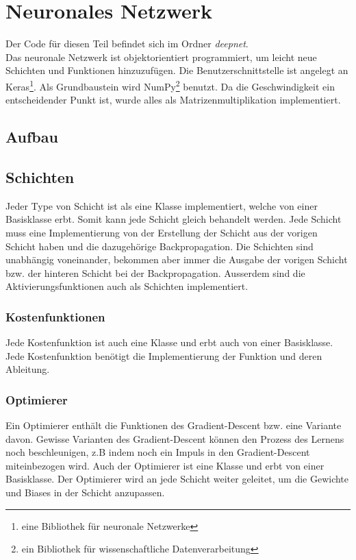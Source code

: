 \documentclass[12pt,a4paper]{report}
\begin{document}
\section{Neuronales Netzwerk}
Der Code für diesen Teil befindet sich im Ordner \textit{deepnet}.\bigskip\\
Das neuronale Netzwerk ist objektorientiert programmiert, um leicht neue Schichten und Funktionen hinzuzufügen.
Die Benutzerschnittstelle ist angelegt an Keras\cite{chollet2015keras}\footnote{eine Bibliothek für neuronale Netzwerke}.
Als Grundbaustein wird NumPy\cite{numpy}\footnote{ein Bibliothek für wissenschaftliche Datenverarbeitung} benutzt.
Da die Geschwindigkeit ein entscheidender Punkt ist, wurde alles als Matrizenmultiplikation implementiert.

\subsection{Aufbau}
\subsection{Schichten}
Jeder Type von Schicht ist als eine Klasse implementiert, welche von einer Basisklasse erbt.
Somit kann jede Schicht gleich behandelt werden.
Jede Schicht muss eine Implementierung von der Erstellung der Schicht aus der vorigen Schicht haben und die dazugehörige Backpropagation.
Die Schichten sind unabhängig voneinander, bekommen aber immer die Ausgabe der vorigen Schicht bzw. der hinteren Schicht bei der Backpropagation.
Ausserdem sind die Aktivierungsfunktionen auch als Schichten implementiert.
\subsubsection{Kostenfunktionen}
Jede Kostenfunktion ist auch eine Klasse und erbt auch von einer Basisklasse.
Jede Kostenfunktion benötigt die Implementierung der Funktion und deren Ableitung.
\subsubsection{Optimierer}
Ein Optimierer enthält die Funktionen des Gradient-Descent bzw. eine Variante davon.
Gewisse Varianten des Gradient-Descent können den Prozess des Lernens noch beschleunigen,
z.B indem noch ein Impuls in den Gradient-Descent miteinbezogen wird\cite{optimization}.
Auch der Optimierer ist eine Klasse und erbt von einer Basisklasse.
Der Optimierer wird an jede Schicht weiter geleitet, um die Gewichte und Biases in der Schicht anzupassen.
\end{document}

